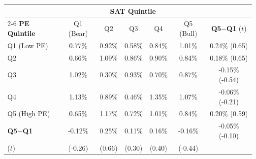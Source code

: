 \begin{tabular}{lcccccc}
\toprule
& \multicolumn{5}{c}{\textbf{SAT Quintile}} & \\
\cmidrule(lr){2-6}
\textbf{PE Quintile} & Q1 (Bear) & Q2 & Q3 & Q4 & Q5 (Bull) & \textbf{Q5$-$Q1} ($t$) \\
\midrule
Q1 (Low PE) & 0.77\% & 0.92\% & 0.58\% & 0.84\% & 1.01\% & 0.24\% (0.65) \\
Q2 & 0.66\% & 1.09\% & 0.86\% & 0.90\% & 0.84\% & 0.18\% (0.65) \\
Q3 & 1.02\% & 0.30\% & 0.93\% & 0.70\% & 0.87\% & -0.15\% (-0.54) \\
Q4 & 1.13\% & 0.89\% & 0.46\% & 1.35\% & 1.07\% & -0.06\% (-0.21) \\
Q5 (High PE) & 0.65\% & 1.17\% & 0.72\% & 1.01\% & 0.84\% & 0.20\% (0.59) \\
\midrule
\textbf{Q5$-$Q1} & -0.12\% & 0.25\% & 0.11\% & 0.16\% & -0.16\% & -0.05\% (-0.10) \\
($t$) & (-0.26) & (0.66) & (0.30) & (0.40) & (-0.44) & \\
\bottomrule
\end{tabular}